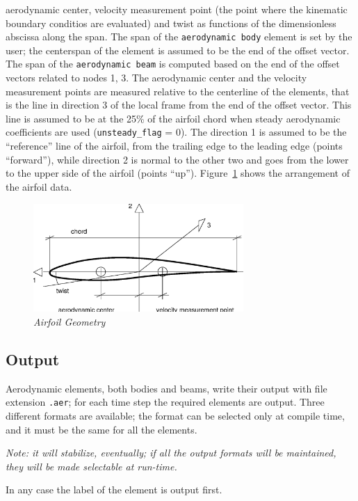 \documentclass[10pt,dvips]{report}
\begin{document}
aerodynamic center, velocity measurement point (the point where the
kinematic boundary conditios are evaluated) and twist as functions 
of the dimensionless abscissa along the span.
The span of the {\tt aerodynamic body} element is set by the user; the
centerspan of the element is assumed to be the end of the offset vector.
The span of the {\tt aerodynamic beam} is computed based on the end of the
offset vectors related to nodes 1, 3.
The aerodynamic center and the velocity measurement points are measured
relative to the centerline of the elements, that is the line in direction 3
of the local frame from the end of the offset vector.
This line is assumed to be at the 25\% of the airfoil chord when steady
aerodynamic coefficients are used ({\tt unsteady\_flag} = 0).
The direction 1 is assumed to be the ``reference'' line of the airfoil, 
from the trailing edge to the leading edge (points ``forward''),
while direction 2 is normal to the other two and goes from the lower 
to the upper side of the airfoil (points ``up''). 
Figure~\ref{fig:AIRFOIL} shows the arrangement of the airfoil data.

\begin{figure}[h]
  \centering
    \includegraphics[width=80mm]{airfoil.eps}
  \caption{\em Airfoil Geometry}\label{fig:AIRFOIL}
\end{figure}


\subsection{Output}
Aerodynamic elements, both bodies and beams, write their output with file
extension {\tt .aer}; for each time step the required elements are output.
Three different formats are available; the format can be selected only at
compile time, and it must be the same for all the elements. 

\noindent
{\em Note: it will stabilize, eventually; if all the output formats will be
maintained, they will be made selectable at run-time.}

\noindent
In any case the label of the element is output first.
\end{document}
